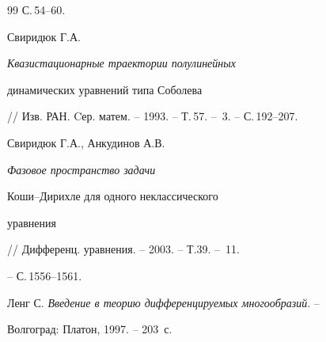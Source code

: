 \begin{thebibliography}{99}
С.\,54--60.




Свиридюк Г.А. {\it Квазистационарные траектории полулинейных 


динамических уравнений типа Соболева}


// Изв. РАН. Cер. матем. -- 1993. -- Т.\,57. -- \No\,3. -- С.\,192--207.




Свиридюк Г.А., Анкудинов А.В. {\it Фазовое пространство задачи 


Коши--Дирихле для одного неклассического


уравнения} // Дифференц. уравнения. -- 2003. -- Т.39. -- \No\,11.


-- С.\,1556--1561.




Ленг С. {\it Введение в теорию дифференцируемых многообразий}. --


Волгоград: Платон, 1997. -- 203~с.





\end{thebibliography}





\vskip 1cm









\smallskip









\label{end}














